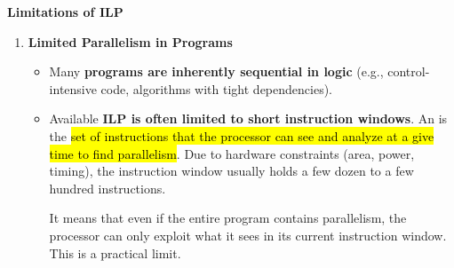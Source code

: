 \highspace
\begin{flushleft}
    \textcolor{Red2}{ \textbf{Limitations of ILP}}
\end{flushleft}
\begin{enumerate}
    \item \textcolor{Red2}{\textbf{Limited Parallelism in Programs}}
    \begin{itemize}
        \item Many \textbf{programs are inherently sequential in logic} (e.g., control-intensive code, algorithms with tight dependencies).
       
       
        \item Available \textbf{ILP is often limited to short instruction windows}. An  is the \hl{set of instructions that the processor can see and analyze at a give time to find parallelism}. Due to hardware constraints (area, power, timing), the instruction window usually holds a few dozen to a few hundred instructions.

        It means that even if the entire program contains parallelism, the processor can only exploit what it sees in its current instruction window. This is a practical limit.
        

\end{itemize}
\end{enumerate}
